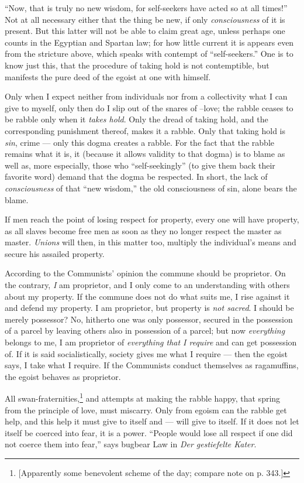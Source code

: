 ``Now, that is truly no new wisdom, for self-seekers have acted so at all 
times!'' Not at all necessary either that the thing be new, if only 
\textit{consciousness} of it is present. But this latter will not be able to 
claim great age, unless perhaps one counts in the Egyptian and Spartan law; 
for how little current it is appears even from the stricture above, which 
speaks with contempt of ``self-seekers.'' One is to know just this, that the 
procedure of taking hold is not contemptible, but manifests the pure deed of 
the egoist at one with himself.

Only when I expect neither from individuals nor from a collectivity what I can 
give to myself, only then do I slip out of the snares of --love; the rabble 
ceases to be rabble only when it \textit{takes hold}. Only the dread of taking 
hold, and the corresponding punishment thereof, makes it a rabble. Only that 
taking hold is \textit{sin}, crime --- only this dogma creates a rabble. For 
the fact that the rabble remains what it is, it (because it allows validity to 
that dogma) is to blame as well as, more especially, those who 
``self-seekingly'' (to give them back their favorite word) demand that the 
dogma be respected. In short, the lack of \textit{consciousness} of that 
``new wisdom,'' the old consciousness of sin, alone bears the blame.

If men reach the point of losing respect for property, every one will have 
property, as all slaves become free men as soon as they no longer respect the 
master as master. \textit{Unions} will then, in this matter too, multiply the 
individual's means and secure his assailed property.

According to the Communists' opinion the commune should be proprietor. On the 
contrary, \textit{I} am proprietor, and I only come to an understanding with 
others about my property. If the commune does not do what suits me, I rise 
against it and defend my property. I am proprietor, but property is 
\textit{not sacred}. I should be merely possessor? No, hitherto one was only 
possessor, secured in the possession of a parcel by leaving others also in 
possession of a parcel; but now \textit{everything} belongs to me, I am 
proprietor of \textit{everything that I require} and can get possession of. If 
it is said socialistically, society gives me what I require --- then the egoist 
says, I take what I require. If the Communists conduct themselves as 
ragamuffins, the egoist behaves as proprietor.

All swan-fraternities,\footnote{[Apparently some benevolent scheme of the day; 
compare note on p. 343.]} and attempts at making the rabble happy, that spring 
from the principle of love, must miscarry. Only from egoism can the rabble get 
help, and this help it must give to itself and --- will give to itself. If it 
does not let itself be coerced into fear, it is a power. ``People would lose 
all respect if one did not coerce them into fear,'' says bugbear Law in 
\textit{Der gestiefelte Kater}.


